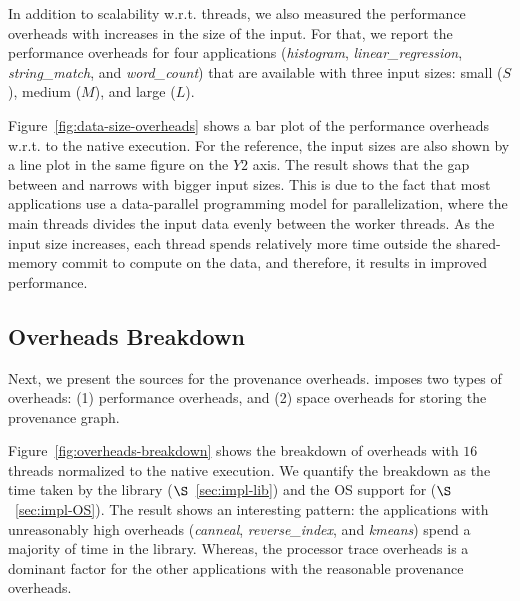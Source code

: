 
%



 In addition to scalability w.r.t.  threads, we also measured the performance overheads with increases in the size of the input.  For that, we
report the performance overheads for four applications ({\em histogram}, {\em linear\_regression}, {\em string\_match}, and {\em word\_count}) that are available with
three input sizes: small ($S$), medium ($M$), and large ($L$).


Figure~\ref{fig:data-size-overheads} shows a bar plot of the performance overheads w.r.t. to the native \pthreads execution. For the reference, the input sizes are also shown by a line plot in the same figure on the $Y2$ axis. The result shows that the gap between \pthreads and \projecttitle narrows with bigger input sizes. This is due to the fact that most applications use a data-parallel programming model for parallelization, where the main threads divides the input data evenly between the worker threads. As the input size increases, each thread spends relatively more time outside the shared-memory commit to compute on the data, and therefore, it results in improved performance.
 

%





\subsection{Overheads Breakdown}
\label{subsec:overheads-breakdown}
Next, we present  the sources for the provenance overheads. \projecttitle imposes two types of overheads: (1) performance overheads, and (2) space overheads for storing the provenance graph.


 Figure~\ref{fig:overheads-breakdown} shows the breakdown of overheads with $16$ threads normalized to the native \pthreads execution. We quantify the breakdown as the time taken by the \projecttitle library ($\S$~\ref{sec:impl-lib}) and the OS support for \intelpt  ($\S$~\ref{sec:impl-OS}). The result shows an interesting pattern: the applications with unreasonably high overheads ({\em canneal}, {\em reverse\_index}, and {\em kmeans}) spend a majority of time in the \projecttitle library. Whereas, the processor trace overheads is a dominant factor for the other applications with the reasonable provenance overheads.


